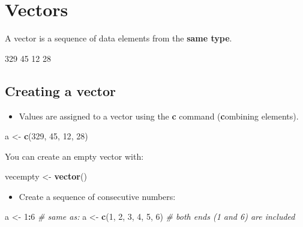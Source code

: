 \documentclass[]{book}
\newenvironment{Shaded}{\begin{snugshade}}{\end{snugshade}}
\newcommand{\CommentTok}[1]{\textcolor[rgb]{0.56,0.35,0.01}{\textit{#1}}}
\newcommand{\DecValTok}[1]{\textcolor[rgb]{0.00,0.00,0.81}{#1}}
\newcommand{\KeywordTok}[1]{\textcolor[rgb]{0.13,0.29,0.53}{\textbf{#1}}}
\newcommand{\NormalTok}[1]{#1}
\newcommand{\OperatorTok}[1]{\textcolor[rgb]{0.81,0.36,0.00}{\textbf{#1}}}
\newcommand{\StringTok}[1]{\textcolor[rgb]{0.31,0.60,0.02}{#1}}
\providecommand{\tightlist}{%
  \setlength{\itemsep}{0pt}\setlength{\parskip}{0pt}}
\begin{document}
\hypertarget{vectors}{%
\section{Vectors}\label{vectors}}

A vector is a sequence of data elements from the \textbf{same type}.

329 \textbar{} 45 \textbar{} 12 \textbar{} 28 \textbar{}

\hypertarget{creating-a-vector}{%
\subsection{Creating a vector}\label{creating-a-vector}}

\begin{itemize}
\tightlist
\item
  Values are assigned to a vector using the \textbf{c} command (\textbf{c}ombining elements).
\end{itemize}

\begin{Shaded}
\begin{Highlighting}[]
\NormalTok{a <-}\StringTok{ }\KeywordTok{c}\NormalTok{(}\DecValTok{329}\NormalTok{, }\DecValTok{45}\NormalTok{, }\DecValTok{12}\NormalTok{, }\DecValTok{28}\NormalTok{)}
\end{Highlighting}
\end{Shaded}

You can create an empty vector with:

\begin{Shaded}
\begin{Highlighting}[]
\NormalTok{vecempty <-}\StringTok{ }\KeywordTok{vector}\NormalTok{()}
\end{Highlighting}
\end{Shaded}

\begin{itemize}
\tightlist
\item
  Create a sequence of consecutive numbers:
\end{itemize}

\begin{Shaded}
\begin{Highlighting}[]
\NormalTok{a <-}\StringTok{ }\DecValTok{1}\OperatorTok{:}\DecValTok{6}
\CommentTok{# same as:}
\NormalTok{a <-}\StringTok{ }\KeywordTok{c}\NormalTok{(}\DecValTok{1}\NormalTok{, }\DecValTok{2}\NormalTok{, }\DecValTok{3}\NormalTok{, }\DecValTok{4}\NormalTok{, }\DecValTok{5}\NormalTok{, }\DecValTok{6}\NormalTok{)}
\CommentTok{# both ends (1 and 6) are included}
\end{Highlighting}
\end{Shaded}
\end{document}
